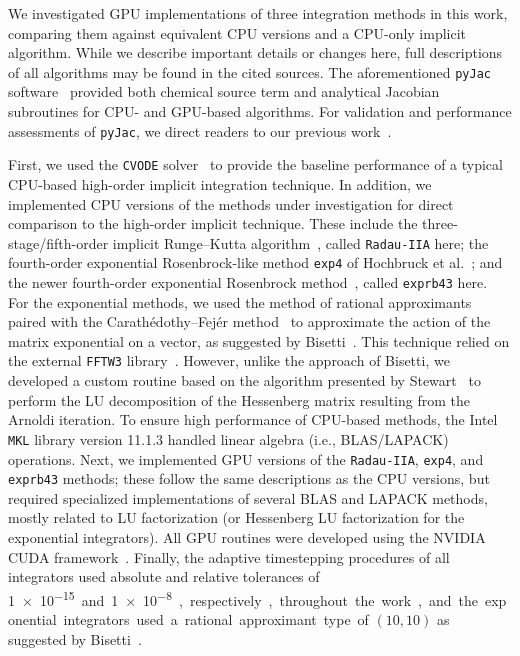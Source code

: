\documentclass[preprint]{elsarticle}
\begin{document}
We investigated GPU implementations of three integration methods in this work, comparing them against equivalent CPU versions and a CPU-only implicit algorithm.
While we describe important details or changes here, full descriptions of all algorithms may be found in the cited sources.
The aforementioned \texttt{pyJac} software~\cite{Niemeyer:2015im} provided both chemical source term and analytical Jacobian subroutines for CPU- and GPU-based algorithms.
For validation and performance assessments of \texttt{pyJac}, we direct readers to our previous work~\cite{Niemeyer:2015ws}.

First, we used the \texttt{CVODE} solver~\cite{Hindmarsh:2005hg} to provide the baseline performance of a typical CPU-based high-order implicit integration technique.
In addition, we implemented CPU versions of the methods under investigation for direct comparison to the high-order implicit technique.
These include the three-stage/fifth-order implicit Runge--Kutta algorithm~\cite{wanner1991solving}, called \texttt{Radau-IIA} here; the fourth-order exponential Rosenbrock-like method \texttt{exp4} of Hochbruck et al.~\cite{Hochbruck:1998}; and the newer fourth-order exponential Rosenbrock method~\cite{Hockbruck:2009}, called \texttt{exprb43} here.
For the exponential methods, we used the method of rational approximants~\cite{gallopoulos:1992} paired with the Carath\'edothy--Fej\'er method~\cite{trefethen:2006} to approximate the action of the matrix exponential on a vector, as suggested by Bisetti~\cite{Bisetti:2012jw}.
This technique relied on the external \texttt{FFTW3} library~\cite{frigo2005design}.
However, unlike the approach of Bisetti, we developed a custom routine based on the algorithm presented by Stewart~\cite{stewart:1998} to perform the LU decomposition of the Hessenberg matrix resulting from the Arnoldi iteration.
To ensure high performance of CPU-based methods, the Intel \texttt{MKL} library version 11.1.3 handled linear algebra (i.e., BLAS/LAPACK) operations.
Next, we implemented GPU versions of the \texttt{Radau-IIA}, \texttt{exp4}, and \texttt{exprb43} methods; these follow the same descriptions as the CPU versions, but required specialized implementations of several BLAS and LAPACK methods, mostly related to LU factorization (or Hessenberg LU factorization for the exponential integrators).
All GPU routines were developed using the NVIDIA CUDA framework~\cite{Buck:2008aa,NVIDIA:2015aa}.
Finally, the adaptive timestepping procedures of all integrators used absolute and relative tolerances of \SI{1e-15} and \SI{1e-8}, respectively, throughout the work, and the exponential integrators used a rational approximant type of $\left(10,10\right)$ as suggested by Bisetti~\cite{Bisetti:2012jw}.
\end{document}
